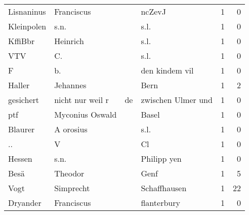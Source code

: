 \begin{tabular}{llllrr}
               Lisnaninus &                         Franciscus &             &                                      ncZevJ &          1 &         0 \\
               Kleinpolen &                               s.n. &             &                                        s.l. &          1 &         0 \\
                  KffiBbr &                           Heinrich &             &                                        s.l. &          1 &         0 \\
                      VTV &                                 C. &             &                                        s.l. &          1 &         0 \\
                        F &                                 b. &             &                              den kindem vil &          1 &         0 \\
                   Haller &                           Jehannes &             &                                        Bern &          1 &         2 \\
                gesichert &                   nicht nur weil r &          de &                          zwischen Ulmer und &          1 &         0 \\
                      ptf &                    Myconius Oswald &             &                                       Basel &          1 &         0 \\
                  Blaurer &                          A orosius &             &                                        s.l. &          1 &         0 \\
                       .. &                                  V &             &                                          Cl &          1 &         0 \\
                   Hessen &                               s.n. &             &                                 Philipp yen &          1 &         0 \\
                     Besä &                            Theodor &             &                                        Genf &          1 &         5 \\
                     Vogt &                          Simprecht &             &                                Schaffhausen &          1 &        22 \\
                 Dryander &                         Franciscus &             &                                 flanterbury &          1 &         0 \\

\end{tabular}
